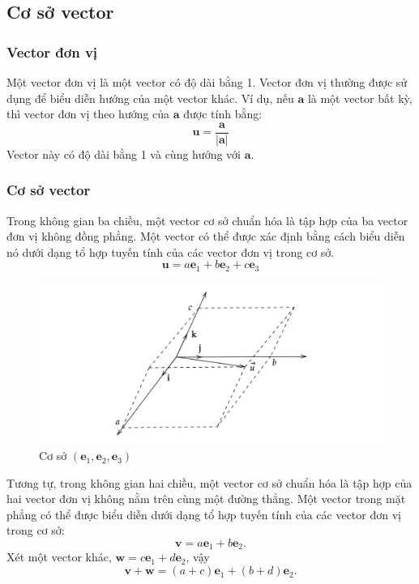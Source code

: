 \subsection{Cơ sở vector}
\subsubsection{Vector đơn vị}
Một vector đơn vị là một vector có độ dài bằng 1. Vector đơn vị thường được sử dụng để biểu diễn hướng của một vector khác. Ví dụ, nếu \(\mathbf{a}\) là một vector bất kỳ, thì vector đơn vị theo hướng của \(\mathbf{a}\) được tính bằng:
\begin{equation}
    \mathbf{u} = \frac{\mathbf{a}}{|\mathbf{a}|} 
\end{equation}
Vector này có độ dài bằng 1 và cùng hướng với \(\mathbf{a}\).
\subsubsection{Cơ sở vector}
Trong không gian ba chiều, một vector cơ sở chuẩn hóa là tập hợp của ba vector đơn vị không đồng phẳng. Một vector có thể được xác định bằng cách biểu diễn nó dưới dạng tổ hợp tuyến tính của các vector đơn vị trong cơ sở.
\begin{equation}
    \mathbf{u}=a\mathbf{e}_1+b\mathbf{e}_2+c\mathbf{e}_3
\end{equation}
\begin{figure}[H]
    \centering
    \includegraphics[width=1\textwidth]{Tuan2/Figures/cosovector.png}
    \caption{Cơ sở \((\mathbf{e}_1, \mathbf{e}_2, \mathbf{e}_3)\)}
\end{figure}
Tương tự, trong không gian hai chiều, một vector cơ sở chuẩn hóa là tập hợp của hai vector đơn vị không nằm trên cùng một đường thẳng. Một vector trong mặt phẳng có thể được biểu diễn dưới dạng tổ hợp tuyến tính của các vector đơn vị trong cơ sở:
\[\mathbf{v}=a\mathbf{e}_1 +b\mathbf{e}_2.\]
Xét một vector khác, \(\mathbf{w}=c\mathbf{e}_1 +d\mathbf{e}_2\), vậy \[\mathbf{v}+\mathbf{w}=(a+c)\mathbf{e}_1 +(b+d)\mathbf{e}_2 .\]
